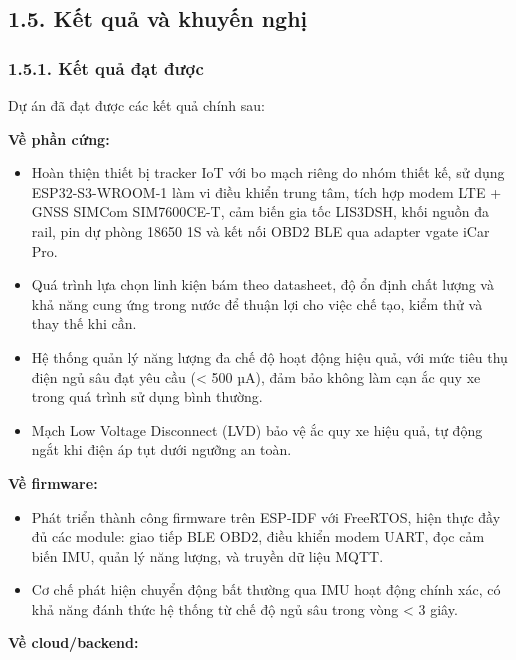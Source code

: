 \documentclass[13pt,a4paper]{extarticle}
\renewcommand{\\}{\thesislongtableorignewline\hline}%
\providecommand{\tightlist}{%
  \setlength{\itemsep}{0pt}\setlength{\parskip}{0pt}}
\begin{document}
\subsection{1.5. Kết quả và khuyến
nghị}\label{15-kux1ebft-quux1ea3-vuxe0-khuyux1ebfn-nghux1ecb}

\subsubsection{1.5.1. Kết quả đạt
được}\label{151-kux1ebft-quux1ea3-ux111ux1ea1t-ux111ux1b0ux1ee3c}

Dự án đã đạt được các kết quả chính sau:

\textbf{Về phần cứng:}

\begin{itemize}
\tightlist
\item
  Hoàn thiện thiết bị tracker IoT với bo mạch riêng do nhóm thiết kế, sử
  dụng ESP32-S3-WROOM-1 làm vi điều khiển trung tâm, tích hợp modem LTE
  + GNSS SIMCom SIM7600CE-T, cảm biến gia tốc LIS3DSH, khối nguồn đa
  rail, pin dự phòng 18650 1S và kết nối OBD2 BLE qua adapter vgate iCar
  Pro.
\item
  Quá trình lựa chọn linh kiện bám theo datasheet, độ ổn định chất lượng
  và khả năng cung ứng trong nước để thuận lợi cho việc chế tạo, kiểm
  thử và thay thế khi cần.
\item
  Hệ thống quản lý năng lượng đa chế độ hoạt động hiệu quả, với mức tiêu
  thụ điện ngủ sâu đạt yêu cầu (\textless{} 500 µA), đảm bảo không làm
  cạn ắc quy xe trong quá trình sử dụng bình thường.
\item
  Mạch Low Voltage Disconnect (LVD) bảo vệ ắc quy xe hiệu quả, tự động
  ngắt khi điện áp tụt dưới ngưỡng an toàn.
\end{itemize}

\textbf{Về firmware:}

\begin{itemize}
\tightlist
\item
  Phát triển thành công firmware trên ESP-IDF với FreeRTOS, hiện thực
  đầy đủ các module: giao tiếp BLE OBD2, điều khiển modem UART, đọc cảm
  biến IMU, quản lý năng lượng, và truyền dữ liệu MQTT.
\item
  Cơ chế phát hiện chuyển động bất thường qua IMU hoạt động chính xác,
  có khả năng đánh thức hệ thống từ chế độ ngủ sâu trong vòng
  \textless{} 3 giây.
\end{itemize}

\textbf{Về cloud/backend:}
\end{document}
